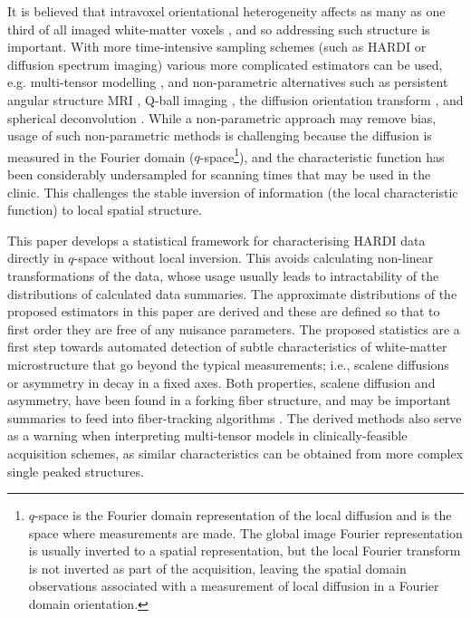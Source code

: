 \documentclass[dvips,aoas,preprint]{imsart}
\numberwithin{equation}{section}
\theoremstyle{plain}
\begin{document}
It is believed that intravoxel orientational heterogeneity affects as
many as one third of all imaged white-matter voxels
\citep{Behrens2007}, and so addressing such structure is important.
With more time-intensive sampling schemes (such as HARDI
\citep{tuc-etal:high} or diffusion spectrum imaging) various more
complicated estimators can be used, e.g. multi-tensor modelling
\citep{Alexander2005}, and non-parametric alternatives such as
persistent angular structure MRI \citep{Jansons}, Q-ball imaging
\citep{Tuch}, the diffusion orientation transform
\citep{Ozarslan2006}, and spherical deconvolution \citep{Tournier}.
While a non-parametric approach may remove bias, usage of such
non-parametric methods is challenging because the diffusion is
measured in the Fourier domain ($q$-space\footnote{$q$-space is the
  Fourier domain representation of the local diffusion and is the
  space where measurements are made.  The global image Fourier
  representation is usually inverted to a spatial representation, but
  the local Fourier transform is not inverted as part of the
  acquisition, leaving the spatial domain observations associated with
  a measurement of local diffusion in a Fourier domain orientation.}),
and the characteristic function has been considerably undersampled for
scanning times that may be used in the clinic.  This challenges the
stable inversion of information (the local characteristic function) to
local spatial structure.

This paper develops a statistical framework for characterising HARDI
data directly in $q$-space \citep{tuc-etal:high} without local
inversion.
This avoids calculating non-linear transformations of the data, whose
usage usually leads to intractability of the distributions of
calculated data summaries.  The approximate distributions of the
proposed estimators in this paper are derived and these are defined so
that to first order they are free of any nuisance parameters.  The
proposed statistics are a first step towards automated detection of
subtle characteristics of white-matter microstructure that go beyond
the typical measurements; i.e., scalene diffusions or asymmetry in
decay in a fixed axes.  Both properties, scalene diffusion and
asymmetry, have been found in a forking fiber structure, and may be
important summaries to feed into fiber-tracking algorithms
\citep{mor-zij:fiber-tracking}.  The derived methods also serve as a
warning when interpreting multi-tensor models in clinically-feasible
acquisition schemes, as similar characteristics can be obtained from
more complex single peaked structures.
\end{document}
